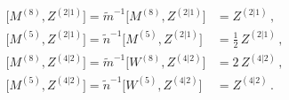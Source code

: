 \begin{equation}
\label{e:MZstuff}
\begin{aligned}
{}\big[M^{(8)}, Z^{(2|1)}\big] = \tilde{m}^{-1} \big[M^{(8)},
  Z^{(2|1)}\big] &= Z^{(2|1)}\,, \\
{}\big[M^{(5)}, Z^{(2|1)}\big] = \tilde{n}^{-1} \big[M^{(5)},
  Z^{(2|1)}\big] &= \tfrac{1}{2}\, Z^{(2|1)}\,, \\
{}\big[M^{(8)}, Z^{(4|2)}\big] = \tilde{m}^{-1} \big[W^{(8)},
  Z^{(4|2)}\big] &= 2\, Z^{(4|2)}\,, \\
{}\big[M^{(5)}, Z^{(4|2)}\big] = \tilde{n}^{-1} \big[W^{(5)},
  Z^{(4|2)}\big] &=  Z^{(4|2)}\,.
\end{aligned}
\end{equation}

